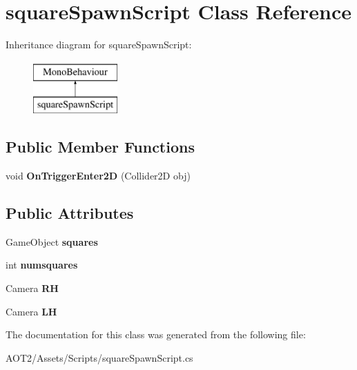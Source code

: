\hypertarget{classsquare_spawn_script}{}\section{square\+Spawn\+Script Class Reference}
\label{classsquare_spawn_script}
Inheritance diagram for square\+Spawn\+Script\+:\begin{figure}[H]
\begin{center}
\leavevmode
\includegraphics[height=2.000000cm]{classsquare_spawn_script}
\end{center}
\end{figure}
\subsection*{Public Member Functions}
\begin{DoxyCompactItemize}
\item 
\hypertarget{classsquare_spawn_script_a072454e82d37b10169a363717acfc2be}{}void {\bfseries On\+Trigger\+Enter2\+D} (Collider2\+D obj)\label{classsquare_spawn_script_a072454e82d37b10169a363717acfc2be}

\end{DoxyCompactItemize}
\subsection*{Public Attributes}
\begin{DoxyCompactItemize}
\item 
\hypertarget{classsquare_spawn_script_a353637659973cde399b46b194b30eb2e}{}Game\+Object {\bfseries squares}\label{classsquare_spawn_script_a353637659973cde399b46b194b30eb2e}

\item 
\hypertarget{classsquare_spawn_script_aee81b01036a29f961a113a21183173e3}{}int {\bfseries numsquares}\label{classsquare_spawn_script_aee81b01036a29f961a113a21183173e3}

\item 
\hypertarget{classsquare_spawn_script_acc39770a5d684a4b5e1057b832dc979d}{}Camera {\bfseries R\+H}\label{classsquare_spawn_script_acc39770a5d684a4b5e1057b832dc979d}

\item 
\hypertarget{classsquare_spawn_script_abf8f64837c29453bfe6231d48b06b483}{}Camera {\bfseries L\+H}\label{classsquare_spawn_script_abf8f64837c29453bfe6231d48b06b483}

\end{DoxyCompactItemize}


The documentation for this class was generated from the following file\+:\begin{DoxyCompactItemize}
\item 
A\+O\+T2/\+Assets/\+Scripts/square\+Spawn\+Script.\+cs\end{DoxyCompactItemize}

